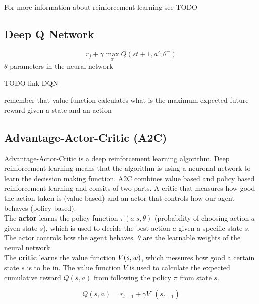 For more information about reinforcement learning see TODO


\subsection{Deep Q Network}

\begin{equation}
r_j + \gamma \max_{a'} Q(s{t+1}, a'; \theta^-)
\end{equation}
$\theta$ parameters in the neural network

TODO link DQN


remember that value function calculates what is the maximum expected future reward given a state and an action
\subsection{Advantage-Actor-Critic (A2C)}
\label{sec:a2c}

Advantage-Actor-Critic is a deep reinforcement learning algorithm. Deep reinforcement learning means that the algorithm is using a neuronal network to learn the decission making function. A2C combines value based and policy based reinforcement learning and consits of two parts. A critic that measures how good the action taken is (value-based) and an actor that controls how our agent behaves (policy-based).\\

The \textbf{actor} learns the policy function $\pi(a | s, \theta)$ (probability of choosing action $a$ given state $s$), which is used to decide the best action $a$ given a specific state $s$.
The actor controls how the agent behaves.
$\theta$ are the learnable weights of the neural network. \\

The \textbf{critic} learns the value function $\mathnormal{V(s, w)}$, which messures how good a certain state $s$ is to be in. The value function $V$ is used to calculate the expected cumulative reward $Q(s, a)$ from following the policy $\pi$ from state $s$.

\begin{equation}
	Q(s, a) = r_{t+1} + \gamma V^\pi(s_{t+1})
\end{equation}


